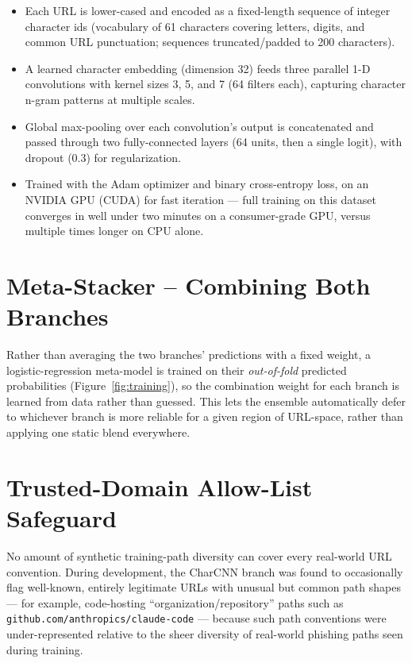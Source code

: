 \documentclass[11pt,a4paper]{report}
\begin{document}
\begin{itemize}[leftmargin=1.4em]
  \item Each URL is lower-cased and encoded as a fixed-length sequence of integer
  character ids (vocabulary of 61 characters covering letters, digits, and common
  URL punctuation; sequences truncated/padded to 200 characters).
  \item A learned character embedding (dimension 32) feeds three parallel 1-D
  convolutions with kernel sizes 3, 5, and 7 (64 filters each), capturing character
  n-gram patterns at multiple scales.
  \item Global max-pooling over each convolution's output is concatenated and passed
  through two fully-connected layers (64 units, then a single logit), with dropout
  (0.3) for regularization.
  \item Trained with the Adam optimizer and binary cross-entropy loss, on an
  NVIDIA GPU (CUDA) for fast iteration --- full training on this dataset converges
  in well under two minutes on a consumer-grade GPU, versus multiple times longer on
  CPU alone.
\end{itemize}

\section{Meta-Stacker -- Combining Both Branches}
Rather than averaging the two branches' predictions with a fixed weight, a
logistic-regression meta-model is trained on their \emph{out-of-fold} predicted
probabilities (Figure~\ref{fig:training}), so the combination weight for each branch
is learned from data rather than guessed. This lets the ensemble automatically defer
to whichever branch is more reliable for a given region of URL-space, rather than
applying one static blend everywhere.

\section{Trusted-Domain Allow-List Safeguard}
No amount of synthetic training-path diversity can cover every real-world URL
convention. During development, the CharCNN branch was found to occasionally flag
well-known, entirely legitimate URLs with unusual but common path shapes --- for
example, code-hosting ``organization/repository'' paths such as
\texttt{github.com/anthropics/claude-code} --- because such path conventions were
under-represented relative to the sheer diversity of real-world phishing paths seen
during training.
\end{document}
